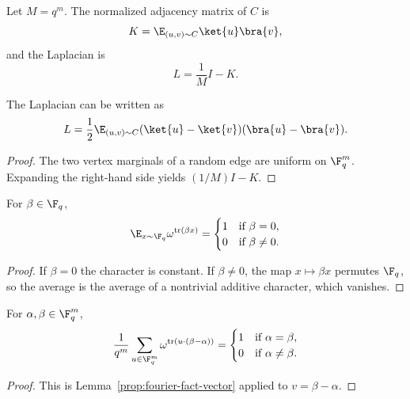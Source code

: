 \begin{definition}\label{def:adjacency-laplacian}
	\leanok
	Let $M=q^m$. The normalized adjacency matrix of $C$ is
	\[
		K = \E_{(u,v)\sim C} \ket{u}\bra{v},
	\]
	and the Laplacian is
	\[
		L = \frac{1}{M}I-K.
	\]
\end{definition}

\begin{lemma}\label{prop:laplacian-rewrite}
	\leanok
	The Laplacian can be written as
	\[
		L = \frac12 \E_{(u,v)\sim C} (\ket{u}-\ket{v})(\bra{u}-\bra{v}).
	\]
\end{lemma}
\begin{proof}
	\leanok
	The two vertex marginals of a random edge are uniform on $\F_q^m$. Expanding the right-hand side yields $(1/M)I-K$.
\end{proof}

\begin{lemma}\label{lem:character-average-scalar}
	\leanok
	For $\beta \in \F_q$,
	\[
		\E_{x \sim \F_q} \omega^{\operatorname{tr}(\beta x)} =
		\begin{cases}
			1 & \text{if } \beta=0,    \\
			0 & \text{if } \beta\ne 0.
		\end{cases}
	\]
\end{lemma}
\begin{proof}
	\leanok
	If $\beta=0$ the character is constant. If $\beta\ne 0$, the map $x \mapsto \beta x$ permutes $\F_q$, so the average is the average of a nontrivial additive character, which vanishes.
\end{proof}

\begin{lemma}\label{lem:character-average-vector}
	\leanok
	For $\alpha,\beta \in \F_q^m$,
	\[
		\frac{1}{q^m}\sum_{u \in \F_q^m} \omega^{\operatorname{tr}(u\cdot(\beta-\alpha))} =
		\begin{cases}
			1 & \text{if } \alpha=\beta,    \\
			0 & \text{if } \alpha\ne \beta.
		\end{cases}
	\]
\end{lemma}
\begin{proof}
	\leanok
	This is Lemma~\ref{prop:fourier-fact-vector} applied to $v=\beta-\alpha$.
\end{proof}

